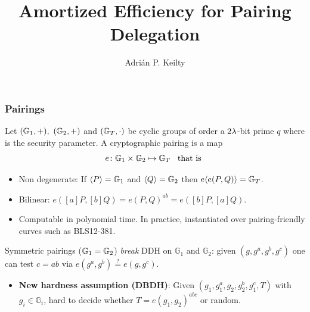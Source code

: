 \documentclass{beamer}
\title[Amortized Pairing Delegation]{Amortized Efficiency for Pairing Delegation}
\author[Adrián P. Keilty]{Adrián P. Keilty} %
\institute[Chalmers]{Chalmers University of Technology} %
\begin{document}
\begin{frame}
\titlepage %
\end{frame}

\begin{frame}
    \frametitle{Pairings}
    \small
Let $(\mathbb{G}_1,+),\,\,(\mathbb{G}_2,+)$ and $(\mathbb{G}_T,\cdot)$ be cyclic groups of order a $2{\lambda}$-bit prime $q$ where \secpar is the security parameter.
\pause
A cryptographic pairing is a map 
$$
e\colon\mathbb{G}_1\times\mathbb{G}_2\mapsto\mathbb{G}_T\,\,\,\text{ that is }
$$ 
\pause
\vspace{-1.5em}
\begin{itemize}
    \item Non degenerate:
    If $\langle P\rangle=\mathbb{G}_1$ and $\langle Q\rangle=\mathbb{G}_2$ then $e\langle e(P, Q)\rangle = \mathbb{G}_T$.
    \pause
    \item Bilinear:
        $e([a]P, [b]Q) = e(P, Q)^{ab} = e([b]P, [a]Q)$.  
    \pause    
    \item Computable in polynomial time. In practice, instantiated over pairing-friendly curves such as BLS12-381.
\end{itemize}
\pause
Symmetric pairings ($\mathbb{G}_1=\mathbb{G}_2$) \emph{break} DDH on $\mathbb{G}_1$ and
    $\mathbb{G}_2$: given $(g, g^a, g^b, g^c)$ one can test $c = ab$ via
    $e(g^a, g^b) \stackrel{?}{=} e(g, g^c)$.
\pause
    \begin{itemize}
  \item \textbf{New hardness assumption (DBDH)}: Given $(g_1, g_1^a, g_2, g_2^b, g_1^c, T)$ with
    $g_i \in \mathbb{G}_i$, hard to decide whether $T = e(g_1,g_2)^{abc}$
    or random.
\end{itemize}
\end{frame}
\end{document}
